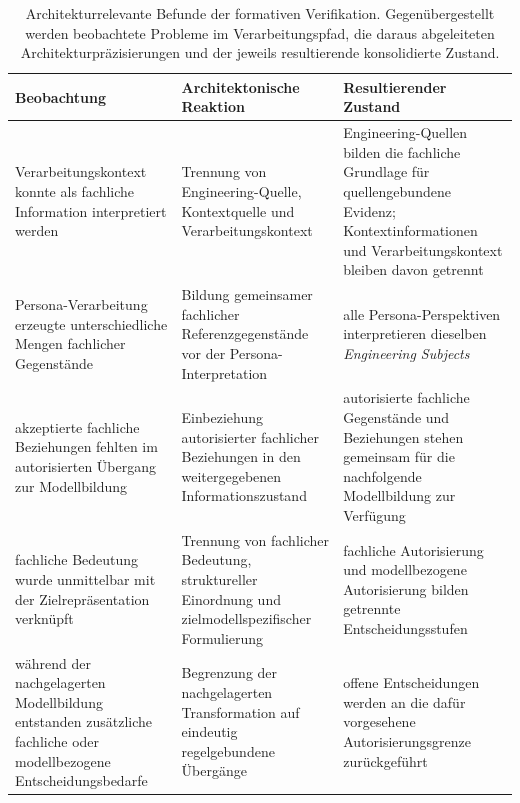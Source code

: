 \begin{table}[htbp]
    \centering
    \small
    \caption[Architekturrelevante Befunde der formativen Verifikation]{
        Architekturrelevante Befunde der formativen Verifikation.
        Gegenübergestellt werden beobachtete Probleme im Verarbeitungspfad, die
        daraus abgeleiteten Architekturpräzisierungen und der jeweils
        resultierende konsolidierte Zustand.}
    \label{tab:validation_architecture_findings}
    \begin{tabular}{p{4.1cm}p{4.8cm}p{4.7cm}}
        \hline
        \textbf{Beobachtung} &
        \textbf{Architektonische Reaktion} &
        \textbf{Resultierender Zustand} \\
        \hline

        Verarbeitungskontext konnte als fachliche Information interpretiert
        werden &
        Trennung von Engineering-Quelle, Kontextquelle und
        Verarbeitungskontext &
        Engineering-Quellen bilden die fachliche Grundlage für
        quellengebundene Evidenz; Kontextinformationen und
        Verarbeitungskontext bleiben davon getrennt \\

        Persona-Verarbeitung erzeugte unterschiedliche Mengen fachlicher
        Gegenstände &
        Bildung gemeinsamer fachlicher Referenzgegenstände vor der
        Persona-Interpretation &
        alle Persona-Perspektiven interpretieren dieselben
        \emph{Engineering Subjects} \\

        akzeptierte fachliche Beziehungen fehlten im autorisierten
        Übergang zur Modellbildung &
        Einbeziehung autorisierter fachlicher Beziehungen in den
        weitergegebenen Informationszustand &
        autorisierte fachliche Gegenstände und Beziehungen stehen gemeinsam
        für die nachfolgende Modellbildung zur Verfügung \\

        fachliche Bedeutung wurde unmittelbar mit der Zielrepräsentation
        verknüpft &
        Trennung von fachlicher Bedeutung, struktureller Einordnung und
        zielmodellspezifischer Formulierung &
        fachliche Autorisierung und modellbezogene Autorisierung bilden
        getrennte Entscheidungsstufen \\

        während der nachgelagerten Modellbildung entstanden zusätzliche
        fachliche oder modellbezogene Entscheidungsbedarfe &
        Begrenzung der nachgelagerten Transformation auf eindeutig
        regelgebundene Übergänge &
        offene Entscheidungen werden an die dafür vorgesehene
        Autorisierungsgrenze zurückgeführt \\
        \hline
    \end{tabular}
\end{table}

